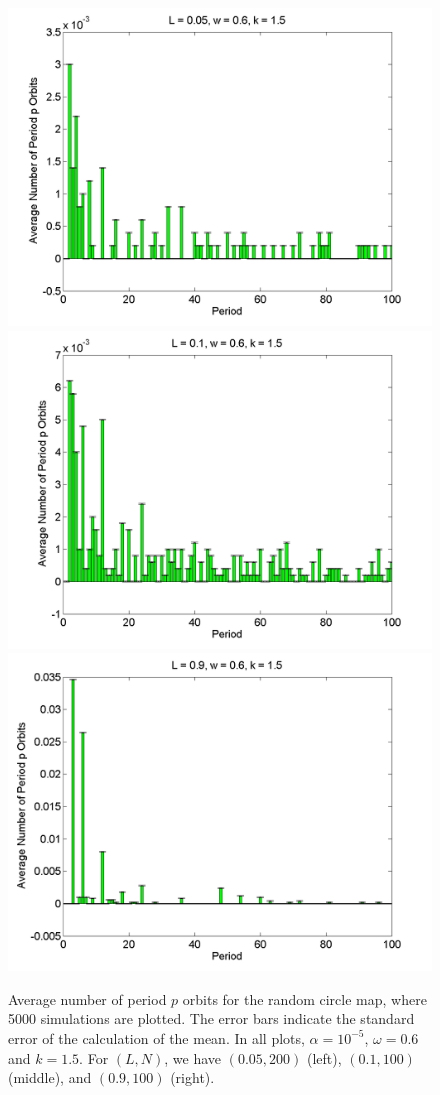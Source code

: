 \begin{figure}[H]\linespread{1}
\caption[Average number of period $p$ orbits for the random circle
map (normal distribution), for $\alpha=10^{-5}$, $\omega=0.6$ and $k=1.5$]{Average number of period $p$ orbits for the random circle
map, where 5000 simulations are plotted. The error bars indicate
the standard error of the calculation of the mean. In all plots,
$\alpha = 10^{-5}$, $\omega=0.6$ and $k=1.5$. For $(L,N)$,
we have $(0.05, 200)$ (left), $(0.1, 100)$
(middle), and $(0.9, 100)$ (right).}\label{fig:rcirchist_n2}
	\begin{center}	\includegraphics[width=.33\textwidth]{figs/rcirc_hist_n_L_005_w_06_k_15_sims_5000.png}\hfill
\includegraphics[width=.33\textwidth]{figs/rcirc_hist_n_L_01_w_06_k_15_sims_5000.png}\hfill
\includegraphics[width=.33\textwidth]{figs/rcirc_hist_n_L_09_w_06_k_15_sims_5000.png}
	\end{center}
\end{figure}

